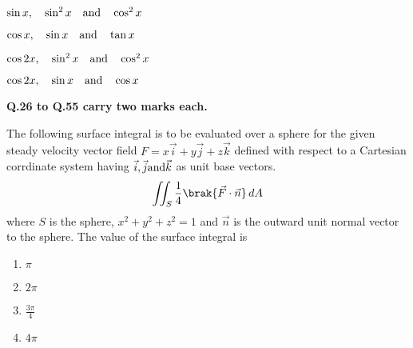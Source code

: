         \begin{enumerate}
                \begin{multicols}{2}
                \item $\sin x, \quad \sin ^2 x \quad \textnormal{and}\quad \cos ^2 x$ \columnbreak
                \item $\cos x,\quad \sin x \quad \textnormal{and}\quad  \tan x$ 
                \end{multicols}
                \begin{multicols}{2}
                \item $\cos 2x,\quad \sin ^2  x \quad \textnormal{and}\quad \cos ^2 x$ \columnbreak
                \item $\cos 2x, \quad \sin x \quad \textnormal{and}\quad \cos x$ 

                \end{multicols}
        \end{enumerate}
        \textbf{Q.26 to Q.55 carry two marks each.}\\
    \item[26.] The following surface integral is to be evaluated over a sphere for the 
        given steady velocity vector field $F = x\vec{i} + y\vec{j} + z\vec{k}$ defined
        with respect to a Cartesian corrdinate system having $\vec{i}, \vec{j} \textnormal{and} \vec{k}$
        as unit base vectors.
        \begin{align}
            \iint_S \frac{1}{4} \brak{\vec{F} \cdot \vec{n}} \, dA 
        \end{align}
        where $S$ is the sphere, $x^2 + y^2 + z^2 = 1$ and $\vec{n}$ is the outward
        unit normal vector to the sphere. The value of the surface integral is
        \hfill{}
        \begin{multicols}{4}
            \begin{enumerate}
                \item $\pi$ 
                    \columnbreak
                \item $2\pi$
                    \columnbreak
                \item $\frac{3\pi}{4}$
                    \columnbreak
                \item $4\pi$
            \end{enumerate}
        \end{multicols}
